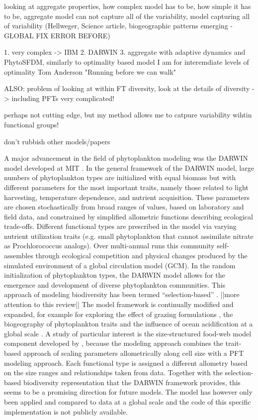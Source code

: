 looking at aggregate properties, how complex model has to be, how simple it has to be, aggregate model can not capture all of the variability, model capturing all of variability (Hellweger, Science article, biogeographic patterns emerging - GLOBAL FIX ERROR BEFORE)

1. very complex -> IBM
2. DARWIN
3. aggregate with adaptive dynamics and PhytoSFDM, similarly to optimality based model
I am for interemdiate levels of optimality
Tom Anderson "Running before we can walk"

ALSO: problem of looking at within FT diversity, look at the details of diversity -> including PFTs very complicated!

perhaps not cutting edge, but my method allows me to catpure variability wihtin functional groups!

don't rubbish other models/papers

A major advancement in the field of phytoplankton modeling was the DARWIN model developed at MIT \citep{Follows2007d}. In the general framework of the DARWIN model, large numbers of phytoplankton types are initialized with equal biomass but with different parameters for the most important traits, namely those related to light harvesting, temperature dependence, and nutrient acquisition. These parameters are chosen stochastically from broad ranges of values, based on laboratory and field data, and constrained by simplified allometric functions describing ecological trade-offs. Different functional types are prescribed in the model via varying nutrient utilization traits (e.g. small phytoplankton that cannot assimilate nitrate as Prochlorococcus analogs). Over multi-annual runs this community self-assembles through ecological competition and physical changes produced by the simulated environment of a global circulation model (GCM). In the random initialization of phytoplankton types, the DARWIN model allows for the emergence and development of diverse phytoplankton communities. This approach of modeling biodiversity has been termed “selection-based” \citep{Follows2011c}. ||more attention to this review|| The model framework is continually modified and expanded, for example for exploring the effect of grazing formulations \citep{Prowe2012c}, the biogeography of phytoplankton traits \citep{Barton2013} and the influence of ocean acidification at a global scale \citep{Dutkiewicz2015}. 
A study of particular interest is the size-structured food-web model component developed by \citet{Ward2012}, because the modeling approach combines the trait-based approach of scaling parameters allometrically along cell size with a PFT modeling approach. Each functional type is assigned a different allometry based on the size ranges and relationships taken from data. Together with the selection-based biodiversity representation that the DARWIN framework provides, this seems to be a promising direction for future models. The model has however only been applied and compared to data at a global scale and the code of this specific implementation is not publicly available.

